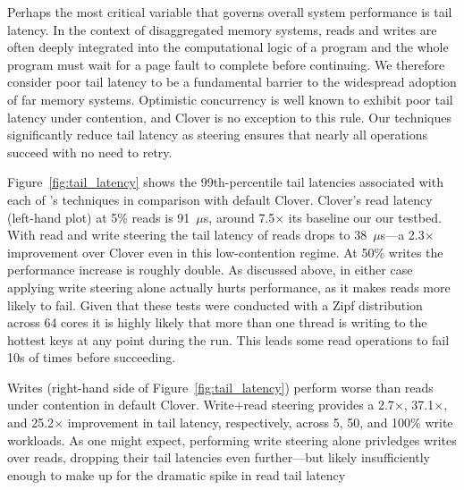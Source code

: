 Perhaps the most critical variable that governs overall system
performance is tail latency. In the context of disaggregated memory
systems, reads and writes are often deeply integrated into the
computational logic of a program and the whole program must wait for a
page fault to complete before continuing. We therefore consider poor
tail latency to be a fundamental barrier to the widespread adoption of
far memory systems.  Optimistic concurrency is well known to exhibit
poor tail latency under contention, and Clover is no exception to this
rule. Our techniques significantly reduce tail latency as steering
ensures that nearly all operations succeed with no need to retry.

Figure~\ref{fig:tail_latency} shows the 99th-percentile tail latencies
associated with each of \sword's techniques in comparison with default
Clover. Clover's read latency (left-hand plot) at 5\% reads is
91~$\mu$s, around 7.5$\times$ its baseline our our testbed. With read
and write steering the tail latency of reads drops to 38~$\mu$s---a
2.3$\times$ improvement over Clover even in this low-contention
regime. At 50\% writes the performance increase is roughly double.  As
discussed above, in either case applying write steering alone actually
hurts performance, as it makes reads more likely to fail.
Given that these tests were conducted with a
Zipf distribution across 64 cores it is highly likely that more than
one thread is writing to the hottest keys at any point during the
run. This leads some read operations to fail 10s of times before
succeeding.


Writes (right-hand side of Figure~\ref{fig:tail_latency}) perform
worse than reads under contention in default Clover. Write+read
steering provides a 2.7$\times$, 37.1$\times$, and 25.2$\times$
improvement in tail latency, respectively, across 5, 50, and 100\%
write workloads.  As one might expect, performing write steering alone
privledges writes over reads, dropping their tail latencies even
further---but likely insufficiently enough to make up for the dramatic
spike in read tail latency


